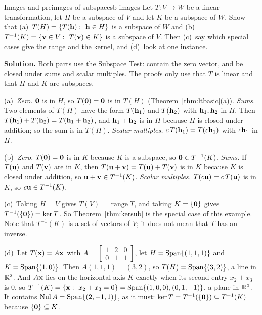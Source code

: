 \documentclass[11pt]{article}
\begin{document}
\begin{exmp}{Images and preimages of subspaces}{b-images}
Let $T:V\to W$ be a linear transformation, let $H$ be a subspace of $V$ and let $K$ be a subspace of $W$. Show that (a)~$T(H)=\{T(\mathbf{h}):\ \mathbf{h}\in H\}$ is a subspace of $W$ and (b)~$T^{-1}(K)=\{\bv{v}\in V:\ T(\bv{v})\in K\}$ is a subspace of $V$. Then (c)~say which special cases give the range and the kernel, and (d)~look at one instance.

\textbf{Solution.} Both parts use the Subspace Test: contain the zero vector, and be closed under sums and scalar multiples. The proofs only use that $T$ is linear and that $H$ and $K$ are subspaces.

(a)~\emph{Zero.} $\mathbf{0}$ is in $H$, so $T(\mathbf{0})=\mathbf{0}$ is in $T(H)$ (Theorem~\ref{thm:ltbasic}(a)). \emph{Sums.} Two elements of $T(H)$ have the form $T(\mathbf{h}_1)$ and $T(\mathbf{h}_2)$ with $\mathbf{h}_1,\mathbf{h}_2$ in $H$. Then $T(\mathbf{h}_1)+T(\mathbf{h}_2)=T(\mathbf{h}_1+\mathbf{h}_2)$, and $\mathbf{h}_1+\mathbf{h}_2$ is in $H$ because $H$ is closed under addition; so the sum is in $T(H)$. \emph{Scalar multiples.} $c\,T(\mathbf{h}_1)=T(c\mathbf{h}_1)$ with $c\mathbf{h}_1$ in $H$.

(b)~\emph{Zero.} $T(\mathbf{0})=\mathbf{0}$ is in $K$ because $K$ is a subspace, so $\mathbf{0}\in T^{-1}(K)$. \emph{Sums.} If $T(\mathbf{u})$ and $T(\mathbf{v})$ are in $K$, then $T(\mathbf{u}+\mathbf{v})=T(\mathbf{u})+T(\mathbf{v})$ is in $K$ because $K$ is closed under addition, so $\mathbf{u}+\mathbf{v}\in T^{-1}(K)$. \emph{Scalar multiples.} $T(c\mathbf{u})=c\,T(\mathbf{u})$ is in $K$, so $c\mathbf{u}\in T^{-1}(K)$.

(c)~Taking $H=V$ gives $T(V)=\operatorname{range}T$, and taking $K=\{\mathbf{0}\}$ gives $T^{-1}(\{\mathbf{0}\})=\ker T$. So Theorem~\ref{thm:kersub} is the special case of this example. Note that $T^{-1}(K)$ is a set of vectors of $V$; it does not mean that $T$ has an inverse.

(d)~Let $T(\mathbf{x})=A\mathbf{x}$ with $A=\begin{bmatrix}1&2&0\\0&1&1\end{bmatrix}$, let $H=\operatorname{Span}\{(1,1,1)\}$ and $K=\operatorname{Span}\{(1,0)\}$. Then $A(1,1,1)=(3,2)$, so $T(H)=\operatorname{Span}\{(3,2)\}$, a line in $\mathbb{R}^2$. And $A\mathbf{x}$ lies on the horizontal axis $K$ exactly when its second entry $x_2+x_3$ is $0$, so $T^{-1}(K)=\{\bv{x}:\ x_2+x_3=0\}=\Span\{(1,0,0),(0,1,-1)\}$, a plane in $\mathbb{R}^3$. It contains $\operatorname{Nul} A=\operatorname{Span}\{(2,-1,1)\}$, as it must: $\ker T=T^{-1}(\{\mathbf{0}\})\subseteq T^{-1}(K)$ because $\{\mathbf{0}\}\subseteq K$.
\end{exmp}
\end{document}
